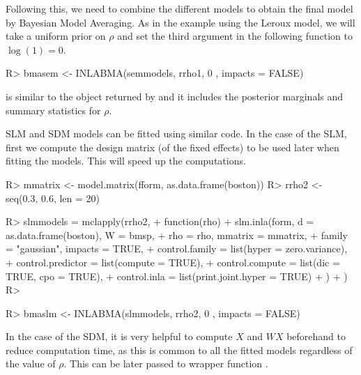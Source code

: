 \documentclass[article]{jss}
\begin{document}
\noindent
Following this, we need to combine the different models
to obtain the final model by Bayesian Model Averaging. As in the
example using the Leroux model, we will take
a uniform prior on $\rho$ and set the third argument in the following
function to $\log(1)=0$. 

\begin{Schunk}
\begin{Sinput}
R> bmasem <- INLABMA(semmodels, rrho1, 0 , impacts = FALSE)
\end{Sinput}
\end{Schunk}

 is similar to the object returned by  and it
includes the posterior marginals and summary statistics for $\rho$.

SLM and SDM models can be fitted using similar code. In the case of
the SLM, first we compute the design matrix (of the fixed effects) 
to be used later when fitting the models. This will speed up the 
computations.

\begin{Schunk}
\begin{Sinput}
R> mmatrix <- model.matrix(fform, as.data.frame(boston))
R> rrho2 <- seq(0.3, 0.6, len = 20)
\end{Sinput}
\end{Schunk}

\begin{Schunk}
\begin{Sinput}
R> slmmodels = mclapply(rrho2,
+          function(rho) {
+                  slm.inla(form, d = as.data.frame(boston), W = bmsp,
+  			rho = rho, mmatrix = mmatrix,
+                          family = "gaussian", impacts = TRUE,
+                          control.family = list(hyper = zero.variance),
+                          control.predictor = list(compute = TRUE),
+                          control.compute = list(dic = TRUE, cpo = TRUE),
+                          control.inla = list(print.joint.hyper = TRUE)
+                  )
+          })
R> 
\end{Sinput}
\end{Schunk}

\begin{Schunk}
\begin{Sinput}
R> bmaslm <- INLABMA(slmmodels, rrho2, 0 , impacts = FALSE)
\end{Sinput}
\end{Schunk}

In the case of the SDM, it is very helpful to compute $X$ and $WX$ beforehand
to reduce computation time, as this is common to all the fitted models
regardless of the value of $\rho$. This can be later passed to wrapper function
.
\end{document}
